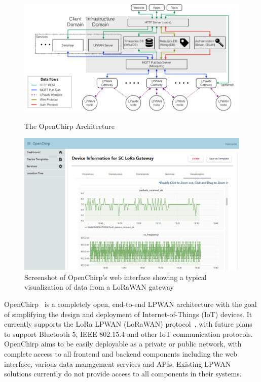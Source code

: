 \documentclass[conference]{IEEEtran}
\begin{document}
\begin{figure}[!htb]
    \centering
    \begin{minipage}[c]{.65\textwidth}
        \centering
        \includegraphics[width=\linewidth]{figures/openChirp_architecture}
        \caption{The OpenChirp Architecture}
        \label{fig:oc-arch}
    \end{minipage}%
    \begin{minipage}[c]{.35\textwidth}
        \centering
        \includegraphics[width=\linewidth]{figures/OC_screenshot}
        \caption{Screenshot of OpenChirp's web interface showing a typical
        visualization of data from a LoRaWAN gateway}
        \label{fig:oc-screenshot}
    \end{minipage}
\end{figure}

OpenChirp~\cite{dongare2017openchirp} is a completely open, end-to-end LPWAN
architecture with the goal of simplifying the design and deployment of
Internet-of-Things (IoT) devices. It currently supports the LoRa LPWAN
(LoRaWAN) protocol~\cite{LoRaWanAlliance2015}, with future plans to support
Bluetooth 5, IEEE 802.15.4 and other IoT communication protocols. OpenChirp
aims to be easily deployable as a private or public network, with complete
access to all frontend and backend components including the web interface,
various data management services and APIs. Existing LPWAN solutions currently
do not provide access to all components in their systems.
\end{document}
